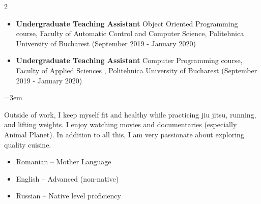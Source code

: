 \documentclass[10pt,a4paper,ragged2e,withhyper]{altacv}
\begin{document}
\begin{paracol}{2}
\divider

\medskip

\switchcolumn




\begin{itemize}

\item {\textbf{Undergraduate Teaching Assistant} \newline Object Oriented Programming course, Faculty of Automatic Control and Computer Science, Politehnica University of Bucharest} {(September 2019 - January 2020)}
\item {\textbf{Undergraduate Teaching Assistant} \newline Computer Programming course, Faculty of Applied Sciences , Politehnica University of Bucharest} {(September 2019 - January 2020)}
\end{itemize}
\medskip

{\emergencystretch=3em
\par}

Outside of work, I keep myself fit and healthy while practicing jiu jitsu, running, and lifting weights. I enjoy watching movies and documentaries (especially Animal Planet). In addition to all this, I am very passionate about exploring quality cuisine.

{\small
\begin{itemize}
  \item Romanian – Mother Language
  \item English – Advanced (non-native)
  \item Russian – Native level proficiency
\end{itemize}
}


\end{paracol}
\newpage
\end{document}
